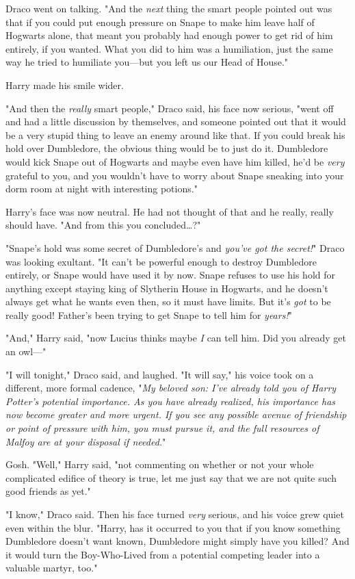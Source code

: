 Draco went on talking. "And the \emph{next} thing the smart people pointed out was that if you could put enough pressure on Snape to make him leave half of Hogwarts alone, that meant you probably had enough power to get rid of him entirely, if you wanted. What you did to him was a humiliation, just the same way he tried to humiliate you---but you left us our Head of House."

Harry made his smile wider.

"And then the \emph{really} smart people," Draco said, his face now serious, "went off and had a little discussion by themselves, and someone pointed out that it would be a very stupid thing to leave an enemy around like that. If you could break his hold over Dumbledore, the obvious thing would be to just do it. Dumbledore would kick Snape out of Hogwarts and maybe even have him killed, he'd be \emph{very} grateful to you, and you wouldn't have to worry about Snape sneaking into your dorm room at night with interesting potions."

Harry's face was now neutral. He had not thought of that and he really, really should have. "And from this you concluded{\ldots}?"

"Snape's hold was some secret of Dumbledore's and \emph{you've got the secret!}" Draco was looking exultant. "It can't be powerful enough to destroy Dumbledore entirely, or Snape would have used it by now. Snape refuses to use his hold for anything except staying king of Slytherin House in Hogwarts, and he doesn't always get what he wants even then, so it must have limits. But it's \emph{got} to be really good! Father's been trying to get Snape to tell him for \emph{years!}"

"And," Harry said, "now Lucius thinks maybe \emph{I} can tell him. Did you already get an owl---"

"I will tonight," Draco said, and laughed. "It will say," his voice took on a different, more formal cadence, "\emph{My beloved son: I've already told you of Harry Potter's potential importance. As you have already realized, his importance has now become greater and more urgent. If you see any possible avenue of friendship or point of pressure with him, you must pursue it, and the full resources of Malfoy are at your disposal if needed.}"

Gosh. "Well," Harry said, "not commenting on whether or not your whole complicated edifice of theory is true, let me just say that we are not quite such good friends as yet."

"I know," Draco said. Then his face turned \emph{very} serious, and his voice grew quiet even within the blur. "Harry, has it occurred to you that if you know something Dumbledore doesn't want known, Dumbledore might simply have you killed? And it would turn the Boy-Who-Lived from a potential competing leader into a valuable martyr, too."

